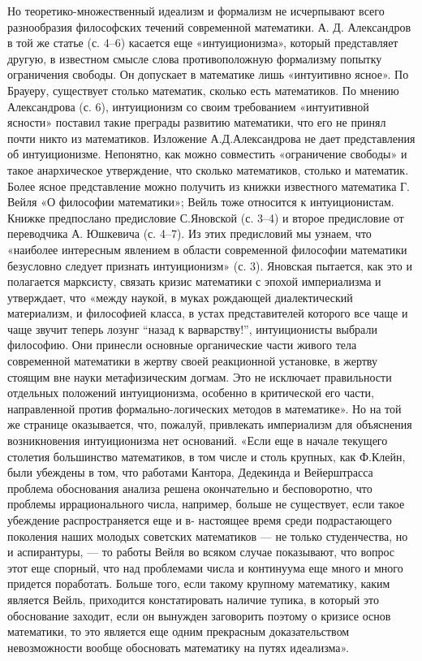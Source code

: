 Но теоретико-множественный  идеализм и формализм не  исчерпывают всего
разнообразия  философских   течений  современной  математики.   А.  Д.
Александров в  той же статье  (с. 4--6) касается  еще «интуиционизма»,
который представляет другую, в  известном смысле слова противоположную
формализму попытку ограничения свободы. Он допускает в математике лишь
«интуитивно ясное». По Брауеру,  существует столько математик, сколько
есть математиков. По мнению Александрова (с. 6), интуиционизм со своим
требованием  «интуитивной ясности»  поставил  такие преграды  развитию
математики, что  его не принял  почти никто из  математиков. Изложение
А.Д.Александрова  не дает  представления об  интуиционизме. Непонятно,
как  можно  совместить  «ограничение  свободы»  и  такое  анархическое
утверждение, что сколько математиков, столько и математик. Более ясное
представление можно получить из  книжки известного математика Г. Вейля
«О  философии  математики»;  Вейль тоже  относится  к  интуиционистам.
Книжке  предпослано   предисловие  С.Яновской   (с.  3--4)   и  второе
предисловие от переводчика А. Юшкевича  (с. 4--7). Из этих предисловий
мы  узнаем, что  «наиболее интересным  явлением в  области современной
философии математики безусловно следует признать интуиционизм» (с. 3).
Яновская  пытается, как  это  и полагается  марксисту, связать  кризис
математики с  эпохой империализма и  утверждает, что «между  наукой, в
муках  рождающей  диалектический  материализм,  и  философией  класса,
в  устах  представителей  которого  все  чаще  и  чаще  звучит  теперь
лозунг  ``назад  к  варварству!'',  интуиционисты  выбрали  философию.
Они  принесли  основные  органические части  живого  тела  современной
математики  в жертву  своей  реакционной установке,  в жертву  стоящим
вне  науки  метафизическим  догмам.   Это  не  исключает  правильности
отдельных положений  интуиционизма, особенно в критической  его части,
направленной против формально-логических методов  в математике». Но на
той же странице оказывается,  что, пожалуй, привлекать империализм для
объяснения  возникновения интуиционизма  нет  оснований.  «Если еще  в
начале  текущего  столетия  большинство  математиков, в  том  числе  и
столь  крупных,  как  Ф.Клейн,  были  убеждены  в  том,  что  работами
Кантора, Дедекинда и Вейерштрасса  проблема обоснования анализа решена
окончательно  и  бесповоротно,  что  проблемы  иррационального  числа,
например, больше не существует,  если такое убеждение распространяется
еще и в-  настоящее время среди подрастающего  поколения наших молодых
советских математиков  --- не  только студенчества, но  и аспирантуры,
--- то работы  Вейля во всяком случае показывают, что  вопрос этот еще
спорный,  что над  проблемами числа  и  континуума еще  много и  много
придется  поработать. Больше  того, если  такому крупному  математику,
каким  является Вейль,  приходится  констатировать  наличие тупика,  в
который это обоснование заходит, если он вынужден заговорить поэтому о
кризисе  основ  математики,  то  это  является  еще  одним  прекрасным
доказательством  невозможности вообще  обосновать математику  на путях
идеализма».

